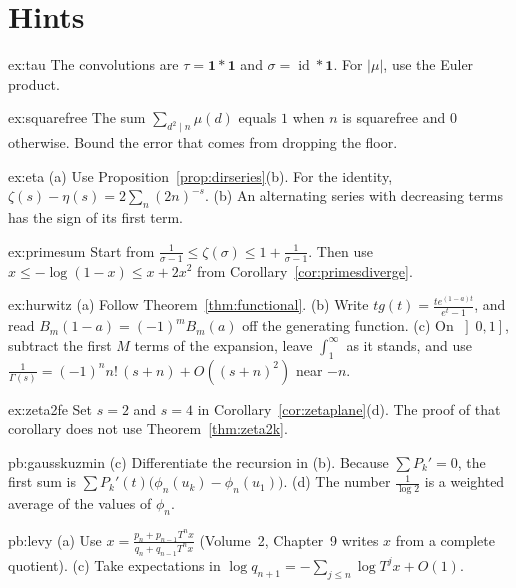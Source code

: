\section{Hints}

\begin{hint}{ex:tau}
The convolutions are $\tau=\mathbf 1*\mathbf 1$ and $\sigma=\operatorname{id}*\mathbf 1$. For $|\mu|$, use the Euler product.
\end{hint}
\begin{hint}{ex:squarefree}
The sum $\sum_{d^2\mid n}\mu(d)$ equals $1$ when $n$ is squarefree and $0$ otherwise. Bound the error that comes from dropping the floor.
\end{hint}
\begin{hint}{ex:eta}
(a) Use Proposition~\ref{prop:dirseries}(b). For the identity, $\zeta(s)-\eta(s)=2\sum_n(2n)^{-s}$. (b) An alternating series with decreasing terms has the sign of its first term.
\end{hint}
\begin{hint}{ex:primesum}
Start from $\frac1{\sigma-1}\le\zeta(\sigma)\le1+\frac1{\sigma-1}$. Then use $x\le-\log(1-x)\le x+2x^2$ from Corollary~\ref{cor:primesdiverge}.
\end{hint}
\begin{hint}{ex:hurwitz}
(a) Follow Theorem~\ref{thm:functional}. (b) Write $tg(t)=\frac{te^{(1-a)t}}{e^t-1}$, and read $B_m(1-a)=(-1)^mB_m(a)$ off the generating function. (c) On $\left]0,1\right]$, subtract the first $M$ terms of the expansion, leave $\int_1^\infty$ as it stands, and use $\frac1{\Gamma(s)}=(-1)^nn!\,(s+n)+O((s+n)^2)$ near $-n$.
\end{hint}
\begin{hint}{ex:zeta2fe}
Set $s=2$ and $s=4$ in Corollary~\ref{cor:zetaplane}(d). The proof of that corollary does not use Theorem~\ref{thm:zeta2k}.
\end{hint}

\begin{hint}{pb:gausskuzmin}
(c) Differentiate the recursion in (b). Because $\sum P_k'=0$, the first sum is $\sum P_k'(t)\bigl(\phi_n(u_k)-\phi_n(u_1)\bigr)$.
(d) The number $\frac1{\log2}$ is a weighted average of the values of $\phi_n$.
\end{hint}

\begin{hint}{pb:levy}
(a) Use $x=\frac{p_n+p_{n-1}T^nx}{q_n+q_{n-1}T^nx}$ (Volume~2, Chapter~9 writes $x$ from a complete quotient). (c) Take expectations in $\log q_{n+1}=-\sum_{j\le n}\log T^jx+O(1)$.
\end{hint}


